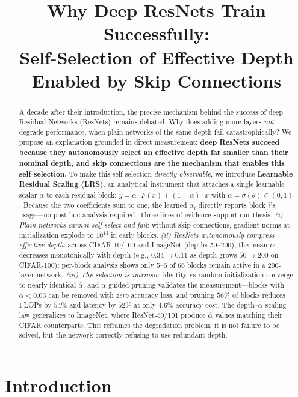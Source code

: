 \documentclass{bmvc2k}
\title{Why Deep ResNets Train Successfully:\\
Self-Selection of Effective Depth Enabled by Skip Connections}
\begin{document}
\maketitle

\begin{abstract}
A decade after their introduction, the precise mechanism behind the success of deep Residual Networks (ResNets) remains debated. Why does adding more layers \emph{not} degrade performance, when plain networks of the same depth fail catastrophically? We propose an explanation grounded in direct measurement: \textbf{deep ResNets succeed because they autonomously select an effective depth far smaller than their nominal depth, and skip connections are the mechanism that enables this self-selection.}
To make this self-selection \emph{directly observable}, we introduce \textbf{Learnable Residual Scaling (LRS)}, an analytical instrument that attaches a single learnable scalar $\alpha$ to each residual block: $y = \alpha \cdot F(x) + (1 - \alpha) \cdot x$ with $\alpha = \sigma(\theta) \in (0,1)$. Because the two coefficients sum to one, the learned $\alpha_i$ directly reports block $i$'s usage---no post-hoc analysis required.
Three lines of evidence support our thesis. \emph{(i) Plain networks cannot self-select and fail}: without skip connections, gradient norms at initialization explode to $10^{13}$ in early blocks. \emph{(ii) ResNets autonomously compress effective depth}: across CIFAR-10/100 and ImageNet (depths 50--200), the mean $\bar{\alpha}$ decreases monotonically with depth (e.g., $0.34 \to 0.11$ as depth grows $50 \to 200$ on CIFAR-100); per-block analysis shows only 5--6 of 66 blocks remain active in a 200-layer network. \emph{(iii) The selection is intrinsic}: identity vs random initialization converge to nearly identical $\bar{\alpha}$, and $\alpha$-guided pruning validates the measurement---blocks with $\alpha < 0.03$ can be removed with \emph{zero} accuracy loss, and pruning $56\%$ of blocks reduces FLOPs by $54\%$ and latency by $52\%$ at only $4.6\%$ accuracy cost.
The depth--$\alpha$ scaling law generalizes to ImageNet, where ResNet-50/101 produce $\bar{\alpha}$ values matching their CIFAR counterparts. This reframes the degradation problem: it is not failure to be solved, but the network correctly refusing to use redundant depth.
\end{abstract}

\section{Introduction}
\label{sec:intro}
\end{document}

